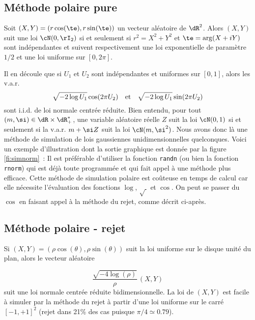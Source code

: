 \subsection{Méthode polaire pure}

\begin{thm}
  Soit $(X,Y)=(r\cos(\te),r\sin(\te))$ un vecteur aléatoire de $\dR^2$. Alors
  $(X,Y)$ suit une loi $\cN(0,\rI_2)$ si et seulement si $r^2=X^2+Y^2$ et
  $\te=\arg(X+iY)$ sont indépendantes et suivent respectivement une loi
  exponentielle de paramètre $1/2$ et une loi uniforme sur $[0,2\pi]$.
\end{thm}

Il en découle que si $U_1$ et $U_2$ sont indépendantes et uniformes sur
$[0,1]$, alors les v.a.r.
$$
\sqrt{-2\log U_1} \cos(2\pi U_2) \text{\quad et\quad} \sqrt{-2\log U_1}\sin(2\pi U_2)
$$
sont i.i.d. de loi normale centrée réduite. Bien entendu, pour tout
$(m,\si)\in\dR\times\dR_+^*$, une variable aléatoire réelle $Z$ suit la loi
$\cN(0,1)$ si et seulement si la v.a.r. $m+\si Z$ suit la loi $\cN(m,\si^2)$.
Nous avons donc là une méthode de simulation de lois gaussiennes
unidimensionnelles quelconques. Voici un exemple d'illustration dont la sortie
graphique est donnée par la figure \ref{fi:simnorm}~:
%
%
%
Il est préférable d'utiliser la fonction \ML{} \texttt{randn} (ou bien la
fonction \SB{} \texttt{rnorm}) qui est déjà toute programmée et qui fait appel
à une méthode plus efficace. Cette méthode de simulation polaire est coûteuse
en temps de calcul car elle nécessite l'évaluation des fonctions $\log$,
$\sqrt{\ }$ et $\cos$. On peut se passer du $\cos$ en faisant appel à la
méthode du rejet, comme décrit ci-après.

\subsection{Méthode polaire - rejet}

Si $(X,Y)=(\rho\cos(\theta),\rho\sin(\theta))$ suit la loi uniforme sur le
disque unité du plan, alors le vecteur aléatoire

$$
\frac{\sqrt{-4\log(\rho)}}{\rho}\,(X,Y)
$$
suit une loi normale centrée réduite bidimensionnelle.  La loi de $(X,Y)$
est facile à simuler par la méthode du rejet à partir d'une loi uniforme sur
le carré $[-1,+1]^2$ (rejet dans 21\% des cas puisque $\pi/4\simeq 0.79$).

